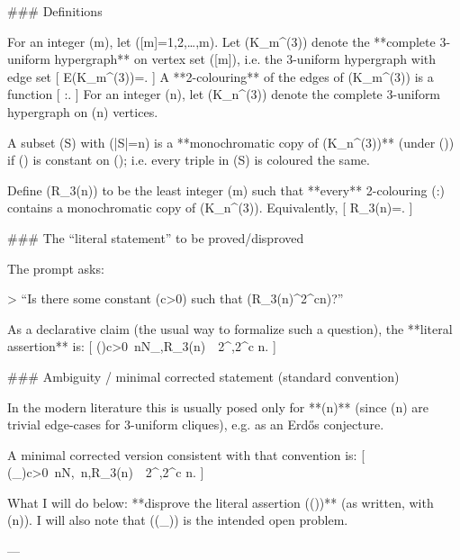 ### Definitions

For an integer (m), let ([m]={1,2,\dots,m}).
Let (K_m^{(3)}) denote the **complete 3-uniform hypergraph** on vertex set ([m]), i.e. the 3-uniform hypergraph with edge set
[
E(K_m^{(3)})=.
]
A **2-colouring** of the edges of (K_m^{(3)}) is a function
[
\chi:.
]
For an integer (n), let (K_n^{(3)}) denote the complete 3-uniform hypergraph on (n) vertices.

A subset (S\subseteq [m]) with (|S|=n) is a **monochromatic copy of (K_n^{(3)})** (under (\chi)) if (\chi) is constant on (); i.e. every triple in (S) is coloured the same.

Define (R_3(n)) to be the least integer (m) such that **every** 2-colouring (\chi:) contains a monochromatic copy of (K_n^{(3)}). Equivalently,
[
R_3(n)=\min{}.
]

### The “literal statement” to be proved/disproved

The prompt asks:

> “Is there some constant (c>0) such that (R_3(n)^{2^{cn}})?”

As a declarative claim (the usual way to formalize such a question), the **literal assertion** is:
[
(\star)\qquad \exists c>0\ \forall n\in\mathbb N_{},\quad R_3(n)\ \ge\ 2^{,2^{c n}}.
]

### Ambiguity / minimal corrected statement (standard convention)

In the modern literature this is usually posed only for **(n)** (since (n) are trivial edge-cases for 3-uniform cliques), e.g. as an Erdős conjecture. 

A minimal corrected version consistent with that convention is:
[
(\star_{})\qquad \exists c>0\ \forall n\in\mathbb N,\ n,\quad R_3(n)\ \ge\ 2^{,2^{c n}}.
]

What I will do below: **disprove the literal assertion ((\star))** (as written, with (n)). I will also note that ((\star_{})) is the intended open problem.

---
